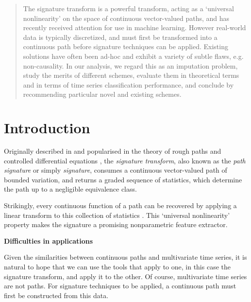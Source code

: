 \documentclass{article}
\renewcommand{\subsubsection}[1]{\textbf{#1}

} %
\begin{document}
\printAffiliationsAndNotice{\icmlEqualContribution} %

\begin{abstract}
The signature transform is a powerful transform, acting as a `universal nonlinearity' on the space of continuous vector-valued paths, and has recently received attention for use in machine learning. However real-world data is typically discretized, and must first be transformed into a continuous path before signature techniques can be applied. Existing solutions have often been ad-hoc and exhibit a variety of subtle flaws, e.g. non-causality. In our analysis, we regard this as an imputation problem, study the merits of different schemes, evaluate them in theoretical terms and in terms of time series classification performance, and conclude by recommending particular novel and existing schemes.
\end{abstract}

\section{Introduction}\label{intro}
Originally described in \citep{Chen54, Chen57, Chen58} and popularised in the theory of rough paths and controlled differential equations \citep{lyons1998differential, hambly2010uniqueness, lyons2014rough}, the \emph{signature transform}, also known as the \emph{path signature} or simply \emph{signature}, consumes a continuous vector-valued path of bounded variation, and returns a graded sequence of statistics, which determine the path up to a negligible equivalence class.

Strikingly, every continuous function of a path can be recovered by applying a linear transform to this collection of statistics \citep[Proposition A.6]{kidger2019deep}. This `universal nonlinearity' property makes the signature a promising nonparametric feature extractor.

\subsubsection{Difficulties in applications}

Given the similarities between continuous paths and multivariate time series, it is natural to hope that we can use the tools that apply to one, in this case the signature transform, and apply it to the other. Of course, multivariate time series are not paths. For signature techniques to be applied, a continuous path must first be constructed from this data.
\end{document}
